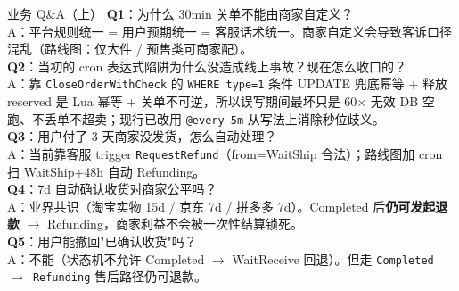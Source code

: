 \documentclass[aspectratio=169,11pt]{beamer}
\begin{document}
\begin{frame}[shrink]{业务 Q\&A（上）}
\textbf{Q1}：为什么 30min 关单不能由商家自定义？\\
\hspace{4mm}\small A：平台规则统一 = 用户预期统一 = 客服话术统一。商家自定义会导致客诉口径混乱（路线图：仅大件 / 预售类可商家配）。\\

\vspace{1mm}
\textbf{Q2}：当初的 cron 表达式陷阱为什么没造成线上事故？现在怎么收口的？\\
\hspace{4mm}\small A：靠 \texttt{CloseOrderWithCheck} 的 \texttt{WHERE type=1} 条件 UPDATE 兜底幂等 + 释放 reserved 是 Lua 幂等 + 关单不可逆，所以误写期间最坏只是 60× 无效 DB 空跑、不丢单不超卖；现行已改用 \texttt{@every 5m} 从写法上消除秒位歧义。\\

\vspace{1mm}
\textbf{Q3}：用户付了 3 天商家没发货，怎么自动处理？\\
\hspace{4mm}\small A：当前靠客服 trigger \texttt{RequestRefund}（from=WaitShip 合法）；路线图加 cron 扫 WaitShip+48h 自动 Refunding。\\

\vspace{1mm}
\textbf{Q4}：7d 自动确认收货对商家公平吗？\\
\hspace{4mm}\small A：业界共识（淘宝实物 15d / 京东 7d / 拼多多 7d）。Completed 后\textbf{仍可发起退款} $\to$ Refunding，商家利益不会被一次性结算锁死。\\

\vspace{1mm}
\textbf{Q5}：用户能撤回"已确认收货"吗？\\
\hspace{4mm}\small A：不能（状态机不允许 Completed $\to$ WaitReceive 回退）。但走 \texttt{Completed $\to$ Refunding} 售后路径仍可退款。\\
\end{frame}
\end{document}
